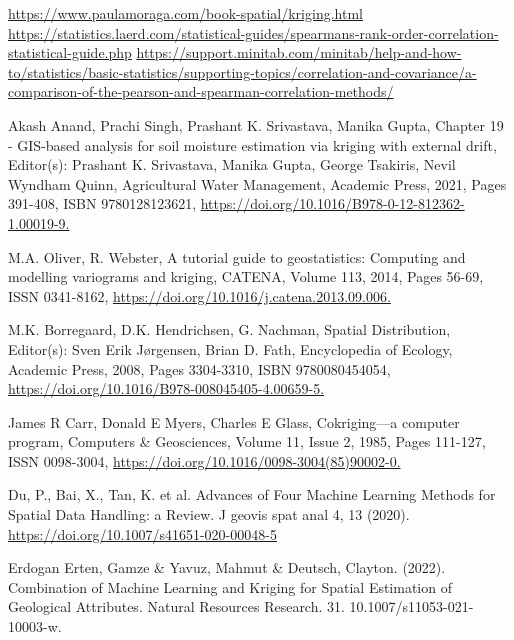\documentclass{swmcmthesis}
\begin{document}
\begin{thebibliography}{9}%
 \url{https://www.paulamoraga.com/book-spatial/kriging.html}
 \url{https://statistics.laerd.com/statistical-guides/spearmans-rank-order-correlation-statistical-guide.php}
 \url{https://support.minitab.com/minitab/help-and-how-to/statistics/basic-statistics/supporting-topics/correlation-and-covariance/a-comparison-of-the-pearson-and-spearman-correlation-methods/}

 Akash Anand, Prachi Singh, Prashant K. Srivastava, Manika Gupta,
Chapter 19 - GIS-based analysis for soil moisture estimation via kriging with external drift,
Editor(s): Prashant K. Srivastava, Manika Gupta, George Tsakiris, Nevil Wyndham Quinn,
Agricultural Water Management,
Academic Press,
2021,
Pages 391-408,
ISBN 9780128123621,
\url{https://doi.org/10.1016/B978-0-12-812362-1.00019-9.}

 M.A. Oliver, R. Webster,
A tutorial guide to geostatistics: Computing and modelling variograms and kriging,
CATENA,
Volume 113,
2014,
Pages 56-69,
ISSN 0341-8162,
\url{https://doi.org/10.1016/j.catena.2013.09.006.}

 M.K. Borregaard, D.K. Hendrichsen, G. Nachman,
Spatial Distribution,
Editor(s): Sven Erik Jørgensen, Brian D. Fath,
Encyclopedia of Ecology,
Academic Press,
2008,
Pages 3304-3310,
ISBN 9780080454054,
\url{https://doi.org/10.1016/B978-008045405-4.00659-5.}

 James R Carr, Donald E Myers, Charles E Glass,
Cokriging—a computer program,
Computers \& Geosciences,
Volume 11, Issue 2,
1985,
Pages 111-127,
ISSN 0098-3004,
\url{https://doi.org/10.1016/0098-3004(85)90002-0.}

 Du, P., Bai, X., Tan, K. et al. Advances of Four Machine Learning Methods for Spatial Data Handling: a Review. J geovis spat anal 4, 13 (2020). \url{https://doi.org/10.1007/s41651-020-00048-5}

 Erdogan Erten, Gamze \& Yavuz, Mahmut \& Deutsch, Clayton. (2022). Combination of Machine Learning and Kriging for Spatial Estimation of Geological Attributes. Natural Resources Research. 31. 10.1007/s11053-021-10003-w. 



\end{thebibliography}


\newpage
\end{document}
